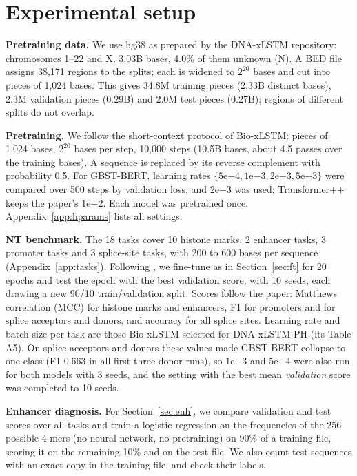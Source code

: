 \documentclass{article}
\begin{document}
\section{Experimental setup}\label{sec:setup}

\textbf{Pretraining data.} We use hg38 as prepared by the DNA-xLSTM repository: chromosomes 1--22 and
X, 3.03B bases, 4.0\% of them unknown (N). A BED file assigns 38,171 regions to the splits; each is
widened to $2^{20}$ bases and cut into pieces of 1,024 bases. This gives 34.8M training pieces
(2.33B distinct bases), 2.3M validation pieces (0.29B) and 2.0M test pieces (0.27B); regions of
different splits do not overlap.

\textbf{Pretraining.} We follow the short-context protocol of Bio-xLSTM: pieces of 1,024 bases,
$2^{20}$ bases per step, 10,000 steps (10.5B bases, about 4.5 passes over the training bases). A
sequence is replaced by its reverse complement with probability 0.5. For GBST-BERT, learning rates
$\{5\mathrm{e}{-4},1\mathrm{e}{-3},2\mathrm{e}{-3},5\mathrm{e}{-3}\}$ were compared over 500 steps by
validation loss, and $2\mathrm{e}{-3}$ was used; Transformer++ keeps the paper's $1\mathrm{e}{-2}$.
Each model was pretrained once. Appendix~\ref{app:hparams} lists all settings.

\textbf{NT benchmark.} The 18 tasks \citep{dallatorre2023nt} cover 10 histone marks, 2 enhancer tasks,
3 promoter tasks and 3 splice-site tasks, with 200 to 600 bases per sequence
(Appendix~\ref{app:tasks}). Following \citet[App.~C.5]{schmidinger2024bioxlstm}, we fine-tune as in
Section~\ref{sec:ft} for 20 epochs and test the epoch with the best validation score, with 10 seeds,
each drawing a new 90/10 train/validation split. Scores follow the paper: Matthews correlation (MCC)
for histone marks and enhancers, F1 for promoters and for splice acceptors and donors, and accuracy
for all splice sites. Learning rate and batch size per task are those Bio-xLSTM selected for
DNA-xLSTM-PH (its Table A5). On splice acceptors and donors these values made GBST-BERT collapse to
one class (F1 0.663 in all first three donor runs), so $1\mathrm{e}{-3}$ and $5\mathrm{e}{-4}$ were
also run for both models with 3 seeds, and the setting with the best mean \emph{validation} score
was completed to 10 seeds.

\textbf{Enhancer diagnosis.} For Section~\ref{sec:enh}, we compare validation and test scores over all
tasks and train a logistic regression on the frequencies of the 256 possible 4-mers (no neural network,
no pretraining) on 90\% of a training file, scoring it on the remaining 10\% and on the test file.
We also count test sequences with an exact copy in the training file, and check their labels.
\end{document}
